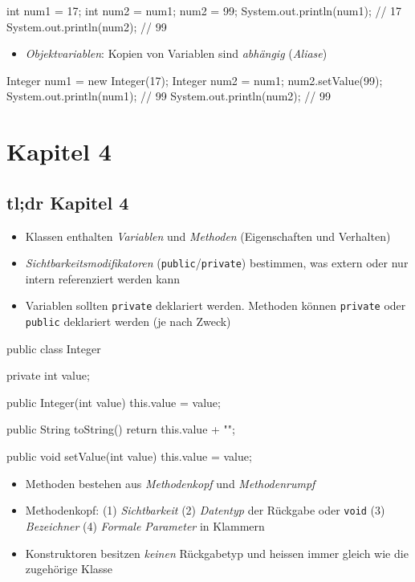 \documentclass[a4paper,10pt, dvipsnames]{report}
\begin{document}
\begin{javacodebox}
int num1 = 17;
int num2 = num1;
num2 = 99;
System.out.println(num1); // 17
System.out.println(num2); // 99
\end{javacodebox}

\begin{itemize}
    \item \textit{Objektvariablen}: Kopien von Variablen sind \textit{abhängig} (\textit{Aliase})
\end{itemize}

\begin{javacodebox}
Integer num1 = new Integer(17);
Integer num2 = num1;
num2.setValue(99);
System.out.println(num1); // 99
System.out.println(num2); // 99
\end{javacodebox}

\chapter{Kapitel 4}
\section{tl;dr Kapitel 4}

\begin{itemize}
    \item Klassen enthalten \textit{Variablen} und \textit{Methoden} (Eigenschaften und Verhalten)
    \item \textit{Sichtbarkeitsmodifikatoren} (\texttt{public}/\texttt{private}) bestimmen, was extern oder nur intern referenziert werden kann
    \item Variablen sollten \texttt{private} deklariert werden. Methoden können \texttt{private} oder \texttt{public} deklariert werden (je nach Zweck)
\end{itemize}

\begin{javacodebox}
public class Integer {

    private int value;

    public Integer(int value) {
    this.value = value;
    }

    public String toString() {
    return this.value + "";
    }

    public void setValue(int value) {
    this.value = value;
    }
}
\end{javacodebox}

\begin{itemize}
    \item Methoden bestehen aus \textit{Methodenkopf} und \textit{Methodenrumpf}
    \item Methodenkopf: (1) \textit{Sichtbarkeit} (2) \textit{Datentyp} der Rückgabe oder \texttt{void} (3) \textit{Bezeichner} (4) \textit{Formale Parameter} in Klammern
    \item Konstruktoren besitzen \textit{keinen} Rückgabetyp und heissen immer gleich wie die zugehörige Klasse
\end{itemize}
\end{document}
